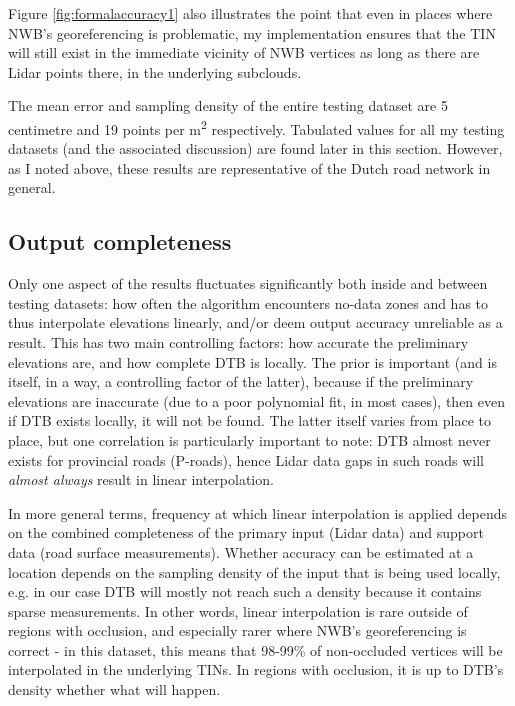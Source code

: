 Figure \ref{fig:formalaccuracy1} also illustrates the point that even in places where NWB's georeferencing is problematic, my implementation ensures that the TIN will still exist in the immediate vicinity of NWB vertices as long as there are Lidar points there, in the underlying subclouds.

The mean error and sampling density of the entire testing dataset are 5 centimetre and 19 points per m\textsuperscript{2} respectively. Tabulated values for all my testing datasets (and the associated discussion) are found later in this section. However, as I noted above, these results are representative of the Dutch road network in general.

\subsection{Output completeness}
\label{sub:completeness}

Only one aspect of the results fluctuates significantly both inside and between testing datasets: how often the algorithm encounters no-data zones and has to thus interpolate elevations linearly, and/or deem output accuracy unreliable as a result. This has two main controlling factors: how accurate the preliminary elevations are, and how complete DTB is locally. The prior is important (and is itself, in a way, a controlling factor of the latter), because if the preliminary elevations are inaccurate (due to a poor polynomial fit, in most cases), then even if DTB exists locally, it will not be found. The latter itself varies from place to place, but one correlation is particularly important to note: DTB almost never exists for provincial roads (P-roads), hence Lidar data gaps in such roads will \textit{almost always} result in linear interpolation.

In more general terms, frequency at which linear interpolation is applied depends on the combined completeness of the primary input (Lidar data) and support data (road surface measurements). Whether accuracy can be estimated at a location depends on the sampling density of the input that is being used locally, e.g. in our case DTB will mostly not reach such a density because it contains sparse measurements. In other words, linear interpolation is rare outside of regions with occlusion, and especially rarer where NWB's georeferencing is correct - in this dataset, this means that 98-99\% of non-occluded vertices will be interpolated in the underlying TINs. In regions with occlusion, it is up to DTB's density whether what will happen.

